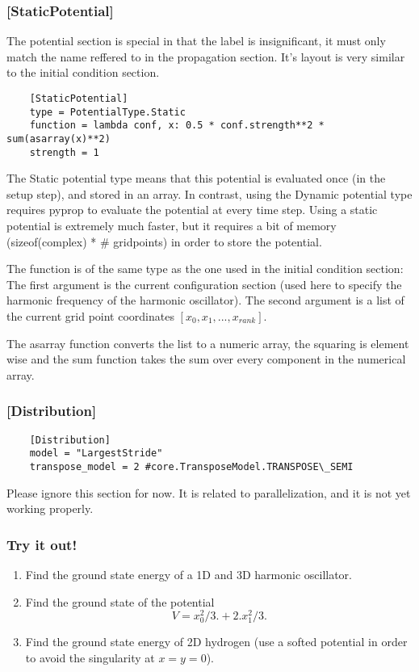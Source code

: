\subsubsection*{[StaticPotential]}
The potential section is special in that the label is insignificant, it must only match the name reffered to in
the propagation section. It's layout is very similar to the initial condition section.
\begin{verbatim}
	[StaticPotential]
	type = PotentialType.Static
	function = lambda conf, x: 0.5 * conf.strength**2 * sum(asarray(x)**2) 
	strength = 1
\end{verbatim}
The Static potential type means that this potential is evaluated once (in the setup step), and stored in an array.
In contrast, using the Dynamic potential type requires pyprop to evaluate the potential at every time step. 
Using a static potential is extremely much faster, but it requires a bit of memory (sizeof(complex) * \# gridpoints)
in order to store the potential.

The function is of the same type as the one used in the initial condition section: The first argument is the current
configuration section (used here to specify the harmonic frequency of the harmonic oscillator). The second argument is
a list of the current grid point coordinates $[x_0, x_1, ..., x_{rank}]$. 

The asarray function converts the list to a
numeric array, the squaring is element wise and the sum function takes the sum over every component in the numerical 
array.

\subsubsection*{[Distribution]}
\begin{verbatim}
	[Distribution]
	model = "LargestStride"
	transpose_model = 2 #core.TransposeModel.TRANSPOSE\_SEMI
\end{verbatim}
Please ignore this section for now. It is related to parallelization, and it is not yet working
properly.

\subsubsection*{Try it out!}
\begin{enumerate}
\item Find the ground state energy of a 1D and 3D harmonic oscillator.

\item Find the ground state of the potential 
\begin{equation}
	V = x_0^2/3. + 2. x_1^2/3.
\end{equation}

\item Find the ground state energy of 2D hydrogen 
(use a softed potential in order to avoid the singularity at $x = y = 0$).
\end{enumerate}

